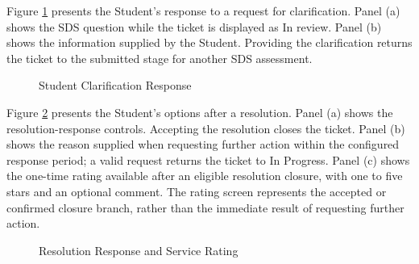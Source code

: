 Figure \ref{fig:sclar} presents the Student's response to a request for clarification. Panel (a) shows the SDS question while the ticket is displayed as In review. Panel (b) shows the information supplied by the Student. Providing the clarification returns the ticket to the submitted stage for another SDS assessment.

\renewcommand{\thefigure}{5.10}
\begin{figure}[htbp]
    \centering
    \begin{minipage}[t]{0.43\linewidth}
        \centering
        \vspace{0pt}
        \par{}\par
    \end{minipage}\hspace{0.04\linewidth}
    \begin{minipage}[t]{0.43\linewidth}
        \centering
        \vspace{0pt}
        \par{}\par
    \end{minipage}
    \caption{Student Clarification Response}
    \label{fig:sclar}
\end{figure}
\FloatBarrier

Figure \ref{fig:reply} presents the Student's options after a resolution. Panel (a) shows the resolution-response controls. Accepting the resolution closes the ticket. Panel (b) shows the reason supplied when requesting further action within the configured response period; a valid request returns the ticket to In Progress. Panel (c) shows the one-time rating available after an eligible resolution closure, with one to five stars and an optional comment. The rating screen represents the accepted or confirmed closure branch, rather than the immediate result of requesting further action.

\renewcommand{\thefigure}{5.11}
\begin{figure}[htbp]
    \centering
    \begin{minipage}[t]{0.43\linewidth}
        \centering
        \vspace{0pt}
        \par{}\par
    \end{minipage}\hspace{0.04\linewidth}
    \begin{minipage}[t]{0.43\linewidth}
        \centering
        \vspace{0pt}
        \par{}\par
    \end{minipage}
    \caption{Resolution Response and Service Rating}
    \label{fig:reply}
\end{figure}
\FloatBarrier

